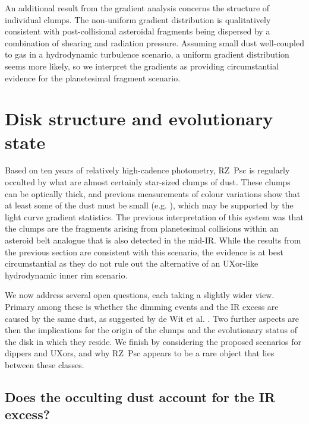 \documentclass[]{rsos}
\begin{document}
An additional result from the gradient analysis concerns the structure of individual
clumps. The non-uniform gradient distribution is qualitatively consistent with
post-collisional asteroidal fragments being dispersed by a combination of shearing and
radiation pressure. Assuming small dust well-coupled to gas in a hydrodynamic turbulence
scenario, a uniform gradient distribution seems more likely, so we interpret the
gradients as providing circumstantial evidence for the planetesimal fragment scenario.

\section{Disk structure and evolutionary state}\label{s:disk}

Based on ten years of relatively high-cadence photometry, RZ~Psc is regularly occulted by
what are almost certainly star-sized clumps of dust. These clumps can be optically thick,
and previous measurements of colour variations show that at least some of the dust must
be small (e.g. \cite{2003ARep...47..580S}), which may be supported by the light curve
gradient statistics. The previous interpretation of this system was that the clumps are
the fragments arising from planetesimal collisions within an asteroid belt analogue that
is also detected in the mid-IR. While the results from the previous section are
consistent with this scenario, the evidence is at best circumstantial as they do not rule
out the alternative of an UXor-like hydrodynamic inner rim scenario.

We now address several open questions, each taking a slightly wider view. Primary among
these is whether the dimming events and the IR excess are caused by the same dust, as
suggested by de Wit et al. \cite{2013A&A...553L...1D}. Two further aspects are then the
implications for the origin of the clumps and the evolutionary status of the disk in
which they reside. We finish by considering the proposed scenarios for dippers and UXors,
and why RZ~Psc appears to be a rare object that lies between these classes.

\subsection{Does the occulting dust account for the IR excess?}\label{ss:ir}
\end{document}
